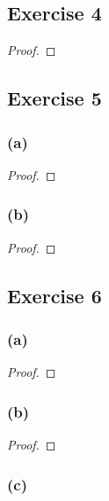 \documentclass[14pt]{extarticle}
\begin{document}
\subsection{Exercise 4}

\begin{proof}

\end{proof}

\subsection{Exercise 5}

\subsubsection{(a)}

\begin{proof}

\end{proof}

\subsubsection{(b)}

\begin{proof}

\end{proof}

\subsection{Exercise 6}

\subsubsection{(a)}

\begin{proof}

\end{proof}

\subsubsection{(b)}

\begin{proof}

\end{proof}

\subsubsection{(c)}
\end{document}
